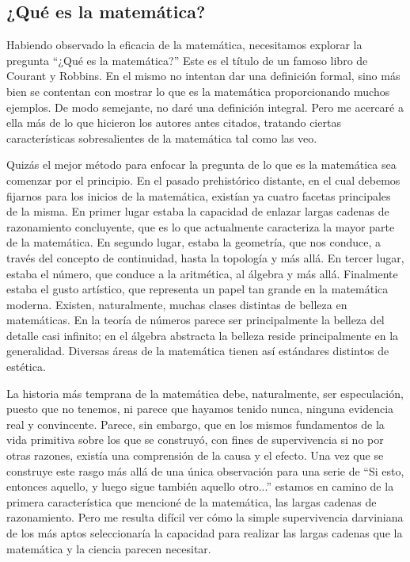\documentclass[a4paper, 12pt]{article}
\begin{document}
 

\subsection*{¿Qué es la matemática?}

 Habiendo observado la eficacia de la matemática, necesitamos explorar la pregunta ``¿Qué es la matemática?'' Este es el título de un famoso libro de Courant y Robbins. En el mismo no intentan dar una definición formal, sino más bien se contentan con mostrar lo que es la matemática proporcionando muchos ejemplos. De modo semejante, no daré una definición integral. Pero me acercaré a ella más de lo que hicieron los autores antes citados, tratando ciertas características sobresalientes de la matemática tal como las veo.

 

Quizás el mejor método para enfocar la pregunta de lo que es la matemática sea comenzar por el principio. En el pasado prehistórico distante, en el cual debemos fijarnos para los inicios de la matemática, existían ya cuatro facetas principales de la misma. En primer lugar estaba la capacidad de enlazar largas cadenas de razonamiento concluyente, que es lo que actualmente caracteriza la mayor parte de la matemática. En segundo lugar, estaba la geometría, que nos conduce, a través del concepto de continuidad, hasta la topología y más allá. En tercer lugar, estaba el número, que conduce a la aritmética, al álgebra y más allá. Finalmente estaba el gusto artístico, que representa un papel tan grande en la matemática moderna. Existen, naturalmente, muchas clases distintas de belleza en matemáticas. En la teoría de números parece ser principalmente la belleza del detalle casi infinito; en el álgebra abstracta la belleza reside principalmente en la generalidad. Diversas áreas de la matemática tienen así estándares distintos de estética.

 

La historia más temprana de la matemática debe, naturalmente, ser especulación, puesto que no tenemos, ni parece que hayamos tenido nunca, ninguna evidencia real y convincente. Parece, sin embargo, que en los mismos fundamentos de la vida primitiva sobre los que se construyó, con fines de supervivencia si no por otras razones, existía una comprensión de la causa y el efecto. Una vez que se construye este rasgo más allá de una única observación para una serie de ``Si esto, entonces aquello, y luego sigue también aquello otro...'' estamos en camino de la primera característica que mencioné de la matemática, las largas cadenas de razonamiento. Pero me resulta difícil ver cómo la simple supervivencia darviniana de los más aptos seleccionaría la capacidad  
para realizar las largas cadenas que la matemática y la ciencia parecen necesitar.
\end{document}
